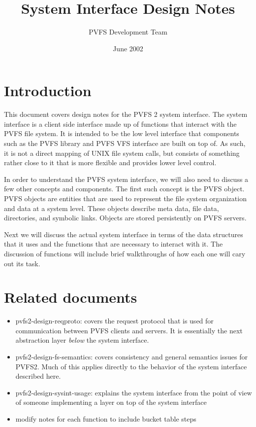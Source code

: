 \documentclass[11pt, letterpaper]{article}
\title{System Interface Design Notes}
\author{ PVFS Development Team }
\date{ June 2002 }
\begin{document}
\maketitle

\tableofcontents

\newpage

\thispagestyle{empty}

\section{Introduction}

This document covers design notes for the PVFS 2 system interface.  The
system interface is a client side interface made up of functions that
interact with the PVFS file system.  It is intended to be the low level
interface that components such as the PVFS library and PVFS
VFS interface are built on top of.  As such, it is not a direct mapping of UNIX file system calls, but consists of something rather
close to it that is more flexible and provides lower level control.

In order to understand the PVFS system interface, we will also
need to discuss a few other concepts and components.  The first such
concept is the PVFS object.   PVFS objects are entities that are used to 
represent the file system organization and data at a system level.
These objects describe meta data, file data, directories, and symbolic
links.  Objects are stored persistently on PVFS servers.

Next we will discuss the actual system interface in terms of the data
structures that it uses and the functions that are necessary to interact
with it.  The discussion of functions will include brief walkthroughs of
how each one will cary out its task. 

\section{Related documents}

\begin{itemize}
\item pvfs2-design-reqproto: covers the request protocol that is used
for communication between PVFS clients and servers.  It is essentially
the next abstraction layer \emph{below} the system interface.
\item pvfs2-design-fs-semantics: covers consistency and general
semantics issues for PVFS2.  Much of this applies directly to the
behavior of the system interface described here.
\item pvfs2-design-sysint-usage: explains the system interface from the
point of view of someone implementing a layer on top of the system
interface
\item modify notes for each function to include bucket table steps
\end{itemize}
\end{document}
